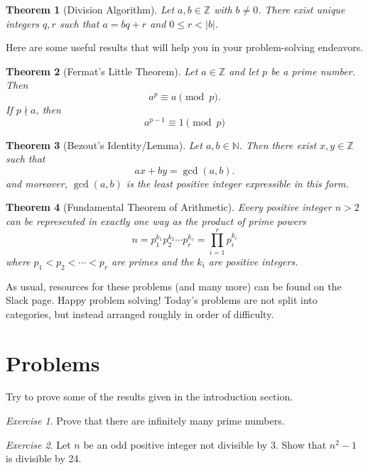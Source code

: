 \documentclass{article}
\newtheorem{theorem}{Theorem}[section]
\theoremstyle{definition}
\theoremstyle{remark}
\newtheorem{exercise}{Exercise}
\newcommand{\NN}{\mathbb{N}}
\newcommand{\ZZ}{\mathbb{Z}}
\begin{document}
    \begin{theorem}[Division Algorithm]
    Let $a, b\in \ZZ$ with $b\neq 0$. There exist unique integers $q,r$ such that $a=bq+r$ and $0 \leq r < |b|$.
    \end{theorem}

    Here are some useful results that will help you in your problem-solving endeavors.

    \begin{theorem}[Fermat's Little Theorem]
        Let \(a\in\ZZ\) and let \(p\) be a prime number. 
        Then
        \[a^p\equiv a\pmod{p}.\]
        If \(p\nmid a\), then 
        \[a^{p-1}\equiv 1\pmod{p}\]
    \end{theorem}

    \begin{theorem}[Bezout's Identity/Lemma]
        Let \(a,b\in\NN\). 
        Then there exist \(x,y\in\ZZ\) such that
        \[ax+by=\gcd(a,b).\]
        and moreover, $\gcd(a,b)$ is the least positive integer expressible in this form.
    \end{theorem}
    
    \begin{theorem}[Fundamental Theorem of Arithmetic]
    Every positive integer $n>2$ can be represented in exactly one way as the product of prime powers
    \[n=p_1^{k_1}p_2^{k_2}\cdots p_r^{k_r}=\prod_{i=1}^r p_i^{k_i}\] where $p_1<p_2<\cdots<p_r$ are primes and the $k_i$ are positive integers.
    \end{theorem}

    As usual, resources for these problems (and many more) can be found on the Slack page. 
    Happy problem solving!
    Today's problems are not split into categories, but instead arranged roughly in order of difficulty.

\section{Problems}

    Try to prove some of the results given in the introduction section.

    \begin{exercise}
        Prove that there are infinitely many prime numbers.
    \end{exercise}

    \begin{exercise}
        Let \(n\) be an odd positive integer not divisible by 3. Show that \(n^2-1\) is divisible by 24.
    \end{exercise}
\end{document}
